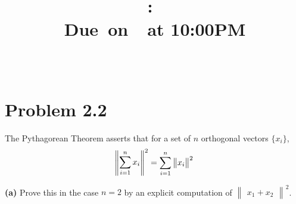 \documentclass{article}
\title{
    \vspace{2in}
    \textmd{\textbf{\hmwkClass:\ \hmwkTitle}}\\
    \normalsize\vspace{0.1in}\small{Due\ on\ \hmwkDueDate\ at 10:00PM}\\
    \vspace{0.1in}\large{\textit{\hmwkClassInstructor\ \hmwkClassTime}}
    \vspace{3in}
}
\author{\hmwkAuthorName}
\date{}
\begin{document}
\maketitle

\pagebreak
\section*{Problem 2.2}
The Pythagorean Theorem asserts that for a set of $n$ orthogonal vectors $\{x_i\}$,
\begin{equation}
    \begin{Vmatrix}\displaystyle
        \sum_{i=1}^n x_i
    \end{Vmatrix}^2 = \sum_{i = 1}^n \begin{Vmatrix}
        x_i
    \end{Vmatrix}^2\\
\end{equation}
 

\textbf{(a)} Prove this in the case $n=2$ by an explicit computation of $\begin{Vmatrix}
    x_1 + x_2
\end{Vmatrix}^2$.
\end{document}
